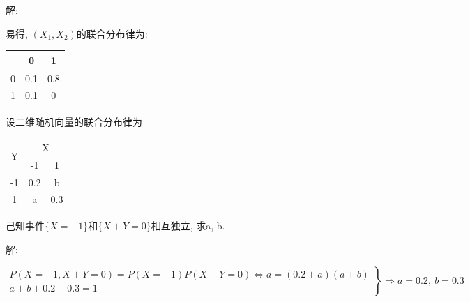\documentclass[standard]{ExBook}
\begin{document}
\begin{qitems}
\vspace{-5em}

    \begin{bbox}
解: 

易得, $(X_1,X_2)$的联合分布律为:
\begin{footnotesize}
\begin{center}
    \renewcommand{\arraystretch}{1.2}
    \setlength{\tabcolsep}{20pt}
    \begin{tabular}{c|c|c}
	    \hline
	    \diagbox{$X_2$}{$P(X,Y)$}{$X_1$} & 0 & 1 \\
	    \hline
	    0 & 0.1 & 0.8 \\
	    \hline
	    1 & 0.1 & 0 \\
	    \hline
    \end{tabular}
\end{center}
\end{footnotesize}
    \end{bbox}

\vspace{-5em}

    \begin{bbox}
    \begin{shaded}
        \qitem
设二维随机向量的联合分布律为
\begin{center}
    \renewcommand{\arraystretch}{1}
    \setlength{\tabcolsep}{6.2em}
    \begin{threeparttable}
    \begin{tabular}{c|cc}
        \hline
        \multirow{2}{*}{Y} & \multicolumn{2}{c}{X}\\
        \cline{2-3}
        & -1 & 1\\
        \hline
        -1 & 0.2 & b \\
        \hline
        1 & a & 0.3\\
        \hline
    \end{tabular}
    \end{threeparttable}
\end{center}
己知事件$\{X = -1\}$和$\{X +Y =0\}$相互独立, 求a, b.
    \end{shaded}
    \end{bbox}

\vspace{-5em}

    \begin{bbox}
解: 
\vspace{-2em}
\begin{center}
\begin{equation}
    \left.
    \begin{array}{r}
        \nonumber
        P(X=-1,X+Y=0)=P(X=-1)P(X+Y=0) \Longleftrightarrow a=(0.2+a)(a+b)\\
        a+b+0.2+0.3=1
    \end{array}
    \right\}
    \Longrightarrow
    a=0.2,\ b=0.3
\end{equation}
\end{center}
    \end{bbox}


\end{qitems}
\end{document}
